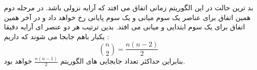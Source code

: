 \documentclass[]{article}
\begin{document}
بد ترین حالت در این الگوریتم زمانی اتفاق می افتد که آرایه نزولی باشد.
در مرحله دوم همین اتفاق برای عناصر یک سوم میانی و یک سوم پایانی رخ خواهد داد و در آخر همین اتفاق
برای یک سوم ابتدایی و میانی می افتد. بدین ترتیب هر دو عنصر ای آرایه دقیقا یکبار
باهم جابجا می شوند که داریم :
$$\binom{n}{2} = \frac{n(n-2)}{2}$$
بنابراین حداکثر تعداد جابجایی های الگوریتم $\frac{n(n-1)}{2}$ خواهد بود.
\end{document}
